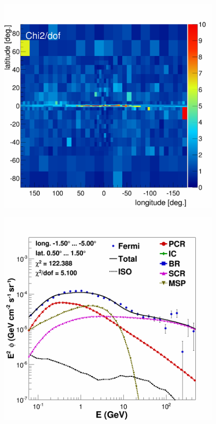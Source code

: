 \begin{figure}[h]
\begin{minipage}[h]{0.45\textwidth}
  	\label{fig:DMonly_CMZ}
  \end{minipage}
  \hfill
  \begin{minipage}[h]{0.45\textwidth}
  	\centering
	\includegraphics[width=1\linewidth]{pic/results/MSPonly_chi2Distribution.png}
  \label{fig:MSPonly_chi2Distribution}
  \end{minipage}
  \hfill
  \begin{minipage}[h]{0.45\textwidth}
  	\centering
	\includegraphics[width=1\linewidth]{pic/results/MSPonly_CMZ.png}
  	\label{fig:MSP_only_CMZ}
  \end{minipage}
  \label{fig:Excess_comp_comparison}
\end{figure}

